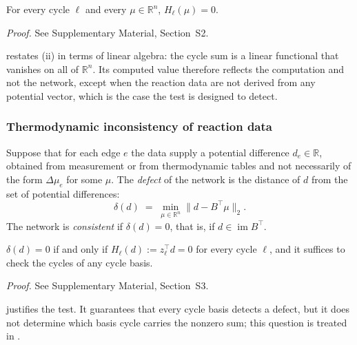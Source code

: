 \documentclass[11pt,a4paper]{article}
\theoremstyle{pstyle}
\theoremstyle{definition}
\theoremstyle{remark}
\newcommand{\R}{\mathbb{R}}
\newcommand{\norm}[1]{\lVert#1\rVert}
\newcommand{\hol}{H}
\begin{document}
\begin{lemma}
\label{lem:vanish}
For every cycle $\ell$ and every $\mu\in\R^{n}$, $\hol_\ell(\mu)=0$.
\end{lemma}

\noindent\emph{Proof.} See Supplementary Material, Section~S2.

 restates (ii) in terms of linear
algebra: the cycle sum is a linear functional that vanishes on all of
$\R^n$. Its computed value therefore reflects the computation and not
the network, except when the reaction data are not derived from any
potential vector, which is the case the test is designed to detect.

\subsubsection{Thermodynamic inconsistency of reaction data}

\begin{definition}
\label{def:defect}
Suppose that for each edge $e$ the data supply a potential difference
$d_e\in\R$, obtained from measurement or from thermodynamic tables and
not necessarily of the form $\Delta\mu_e$ for some $\mu$. The
\emph{defect} of the network is the distance of $d$ from the set of
potential differences:
\begin{equation}
  \delta(d) \;=\; \min_{\mu\in\R^{n}} \norm{d - B^{\top}\mu}_{2}.
  \label{eq:defect}
\end{equation}
The network is \emph{consistent} if $\delta(d)=0$, that is, if
$d\in\operatorname{im}B^{\top}$.
\end{definition}

\begin{proposition}
\label{prop:detect-defect}
$\delta(d)=0$ if and only if $\hol_\ell(d) := z_\ell^{\top}d = 0$ for
every cycle $\ell$, and it suffices to check the cycles of any cycle
basis.
\end{proposition}

\noindent\emph{Proof.} See Supplementary Material, Section~S3.

 justifies the test. It guarantees that every
cycle basis detects a defect, but it does not determine which basis
cycle carries the nonzero sum; this question is treated in
.

\end{document}
